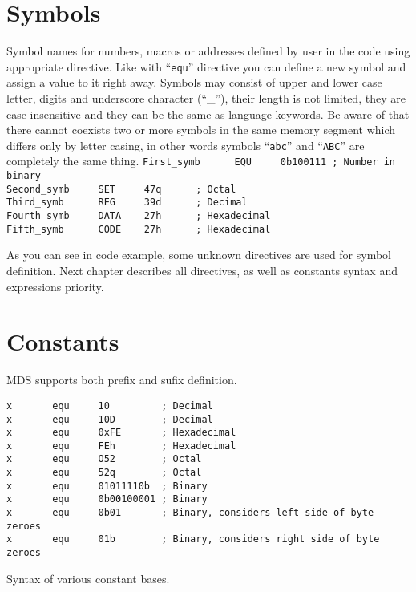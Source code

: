 \section{Symbols}
    Symbol names for numbers, macros or addresses defined by user in the code using appropriate directive. Like with ``\texttt{equ}'' directive you can define a new symbol and assign a value to it right away. Symbols may consist of upper and lower case letter, digits and underscore character (``\_''), their length is not limited, they are case insensitive and they can be the same as language keywords. Be aware of that there cannot coexists two or more symbols in the same memory segment which differs only by letter casing, in other words symbols ``\texttt{abc}'' and ``\texttt{ABC}'' are completely the same thing.
    {
        \usecodefont
        \verb'First_symb      EQU     0b100111 ; Number in binary'\\
        \verb'Second_symb     SET     47q      ; Octal'\\
        \verb'Third_symb      REG     39d      ; Decimal'\\
        \verb'Fourth_symb     DATA    27h      ; Hexadecimal'\\
        \verb'Fifth_symb      CODE    27h      ; Hexadecimal'
    }

    As you can see in code example, some unknown directives are used for symbol definition. Next chapter describes all directives, as well as constants syntax and expressions priority.

\section{Constants}
    MDS supports both prefix and sufix definition.

    \begin{code}[h!]
    {
        \usecodefont

        \verb'x       equ     10         ; Decimal'\\
        \verb'x       equ     10D        ; Decimal'\\
        \verb'x       equ     0xFE       ; Hexadecimal'\\
        \verb'x       equ     FEh        ; Hexadecimal'\\
        \verb'x       equ     O52        ; Octal'\\
        \verb'x       equ     52q        ; Octal'\\
        \verb'x       equ     01011110b  ; Binary'\\
        \verb'x       equ     0b00100001 ; Binary'\\
        \verb'x       equ     0b01       ; Binary, considers left side of byte zeroes'\\
        \verb'x       equ     01b        ; Binary, considers right side of byte zeroes'

        \caption{Syntax of various constant bases.}
        \label{code:svcb}
    }
    \end{code}

